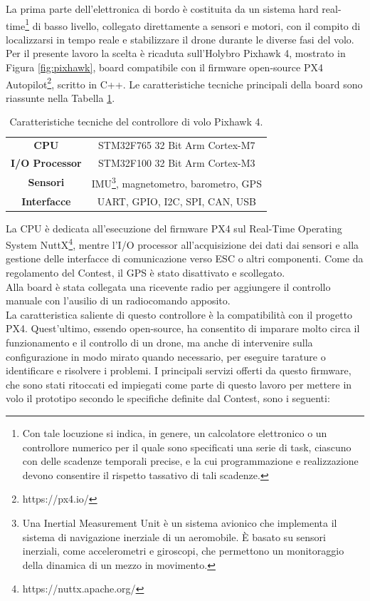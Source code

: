 \indent La prima parte dell'elettronica di bordo è costituita da un sistema hard real-time\footnote{Con tale locuzione si indica, in genere, un calcolatore elettronico o un controllore numerico per il quale sono specificati una serie di task, ciascuno con delle scadenze temporali precise, e la cui programmazione e realizzazione devono consentire il rispetto tassativo di tali scadenze.} di basso livello, collegato direttamente a sensori e motori, con il compito di localizzarsi in tempo reale e stabilizzare il drone durante le diverse fasi del volo. Per il presente lavoro la scelta è ricaduta sull'Holybro Pixhawk 4, mostrato in Figura \ref{fig:pixhawk}, board compatibile con il firmware open-source PX4 Autopilot\footnote{https://px4.io/}, scritto in C++. Le caratteristiche tecniche principali della board sono riassunte nella Tabella \ref{tab:pix}.
\vspace{1.25cm}
\begin{table}[h]
    \centering
    \begin{tabular}{c|c}
        \textbf{CPU} & STM32F765 32 Bit Arm Cortex-M7 \\
        \textbf{I/O Processor} & STM32F100 32 Bit Arm Cortex-M3 \\
        \textbf{Sensori} & IMU\footnote{Una Inertial Measurement Unit è un sistema avionico che implementa il sistema di navigazione inerziale di un aeromobile. È basato su sensori inerziali, come accelerometri e giroscopi, che permettono un monitoraggio della dinamica di un mezzo in movimento.}, magnetometro, barometro, GPS\\
        \textbf{Interfacce} & UART, GPIO, I2C, SPI, CAN, USB
    \end{tabular}
    \caption{Caratteristiche tecniche del controllore di volo Pixhawk 4.}
    \label{tab:pix}
\end{table}
\vfill\clearpage
La CPU è dedicata all'esecuzione del firmware PX4 sul Real-Time Operating System NuttX\footnote{https://nuttx.apache.org/}, mentre l'I/O processor all'acquisizione dei dati dai sensori e alla gestione delle interfacce di comunicazione verso ESC o altri componenti. Come da regolamento del Contest, il GPS è stato disattivato e scollegato.\\
Alla board è stata collegata una ricevente radio per aggiungere il controllo manuale con l'ausilio di un radiocomando apposito.\\
La caratteristica saliente di questo controllore è la compatibilità con il progetto PX4. Quest'ultimo, essendo open-source, ha consentito di imparare molto circa il funzionamento e il controllo di un drone, ma anche di intervenire sulla configurazione in modo mirato quando necessario, per eseguire tarature o identificare e risolvere i problemi. I principali servizi offerti da questo firmware, che sono stati ritoccati ed impiegati come parte di questo lavoro per mettere in volo il prototipo secondo le specifiche definite dal Contest, sono i seguenti:
